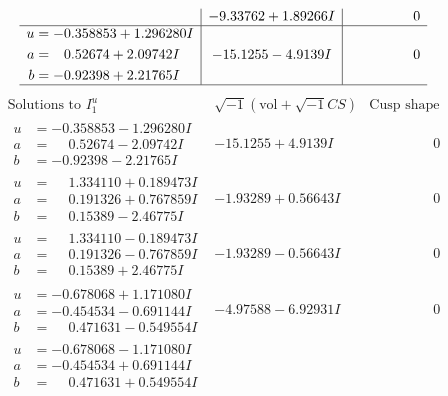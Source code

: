 \documentclass[1p]{elsarticle_modified}
\theoremstyle{definition}
\newcommand{\I}{\sqrt{-1}}
\begin{document}
$$\begin{array}{c|c|c}
 & -9.33762 + 1.89266 I & \phantom{-0.000000 } 0 \\ \hline\begin{aligned}
u &= -0.358853 + 1.296280 I \\
a &= \phantom{-}0.52674 + 2.09742 I \\
b &= -0.92398 + 2.21765 I\end{aligned}
 & -15.1255 - 4.9139 I & \phantom{-0.000000 } 0\\
 \hline 
 \end{array}$$\newpage$$\begin{array}{c|c|c}  
\text{Solutions to }I^u_{1}& \I (\text{vol} + \sqrt{-1}CS) & \text{Cusp shape}\\
 \hline 
\begin{aligned}
u &= -0.358853 - 1.296280 I \\
a &= \phantom{-}0.52674 - 2.09742 I \\
b &= -0.92398 - 2.21765 I\end{aligned}
 & -15.1255 + 4.9139 I & \phantom{-0.000000 } 0 \\ \hline\begin{aligned}
u &= \phantom{-}1.334110 + 0.189473 I \\
a &= \phantom{-}0.191326 + 0.767859 I \\
b &= \phantom{-}0.15389 - 2.46775 I\end{aligned}
 & -1.93289 + 0.56643 I & \phantom{-0.000000 } 0 \\ \hline\begin{aligned}
u &= \phantom{-}1.334110 - 0.189473 I \\
a &= \phantom{-}0.191326 - 0.767859 I \\
b &= \phantom{-}0.15389 + 2.46775 I\end{aligned}
 & -1.93289 - 0.56643 I & \phantom{-0.000000 } 0 \\ \hline\begin{aligned}
u &= -0.678068 + 1.171080 I \\
a &= -0.454534 - 0.691144 I \\
b &= \phantom{-}0.471631 - 0.549554 I\end{aligned}
 & -4.97588 - 6.92931 I & \phantom{-0.000000 } 0 \\ \hline\begin{aligned}
u &= -0.678068 - 1.171080 I \\
a &= -0.454534 + 0.691144 I \\
b &= \phantom{-}0.471631 + 0.549554 I\end{aligned}

\end{array}$$
\end{document}
